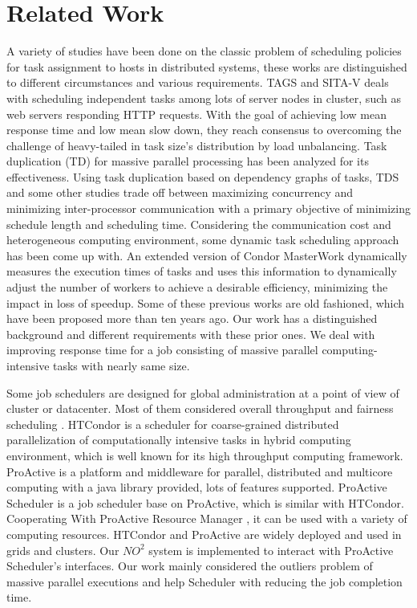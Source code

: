 \section{Related Work}

A variety of studies have been done on the classic problem of scheduling policies for task assignment to hosts in distributed systems, these works are distinguished to different circumstances and various requirements. TAGS \cite{_task_2002} and SITA-V \cite{crovella_task_1998} deals with scheduling independent tasks among lots of server nodes in cluster, such as web servers responding HTTP requests. With the goal of achieving low mean response time and low mean slow down, they reach consensus to overcoming the challenge of heavy-tailed in task size's distribution by load unbalancing. Task duplication (TD) \cite{manoharan_effect_2001} for massive parallel processing has been analyzed for its effectiveness. Using task duplication based on dependency graphs of tasks, TDS \cite{ranaweera_task_2000} and some other studies \cite{ahmad_exploiting_1998} \cite{dogan_ldbs:_2002} trade off between maximizing concurrency and minimizing inter-processor communication with a primary objective of minimizing schedule length and scheduling time. Considering the communication cost and heterogeneous computing environment, some dynamic task \cite{ahmad_semi-distributed_1991} \cite{ucar_task_2006} scheduling approach has been come up with. An extended version of Condor MasterWork \cite{heymann_adaptive_2000} dynamically measures the execution times of tasks and uses this information to dynamically adjust the number of workers to achieve a desirable efficiency, minimizing the impact in loss of speedup. Some of these previous works are old fashioned, which have been proposed more than ten years ago. Our work has a distinguished background and different requirements with these prior ones. We deal with improving response time for a job consisting of massive parallel computing-intensive tasks with nearly same size.

Some job schedulers are designed for global administration at a point of view of cluster or datacenter. Most of them considered overall throughput and fairness scheduling \cite{isard_quincy:_2009}. HTCondor\cite{_htcondor_????} is a scheduler for coarse-grained distributed parallelization of computationally intensive tasks in hybrid computing environment, which is well known for its high throughput computing framework. ProActive \cite{_proactive_????} is a platform and middleware for parallel, distributed and multicore computing with a java library provided, lots of features supported. ProActive Scheduler \cite{_proactive_????-2} is a job scheduler base on ProActive, which is similar with HTCondor. Cooperating With ProActive Resource Manager \cite{_proactive_????-1}, it can be used with a variety of computing resources. HTCondor and ProActive are widely deployed and used in grids and clusters. Our $NO^2$ system is implemented to interact with ProActive Scheduler's interfaces. Our work mainly considered the outliers problem of massive parallel executions and help Scheduler with reducing the job completion time.


